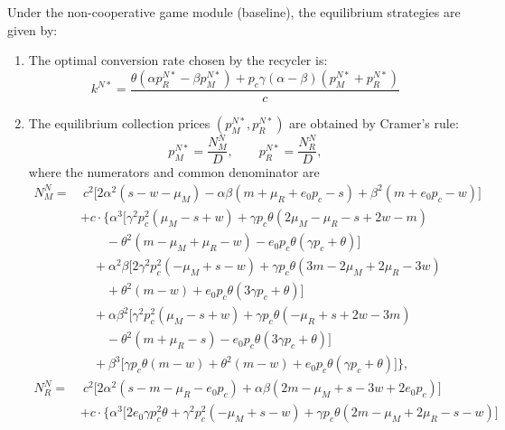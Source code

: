\documentclass[authoryear,preprint,review,times,10pt]{elsarticle}
\begin{document}
\begin{prop}
\label{prop:baseline}
Under the non-cooperative game module (baseline), the equilibrium strategies are given by:
\begin{enumerate}[label={(\arabic*)}]
\item The optimal conversion rate chosen by the recycler is:
\begin{equation}
k^{N*} = \frac{\theta(\alpha p_R^{N*} - \beta p_M^{N*}) + p_c \gamma (\alpha - \beta)(p_M^{N*} + p_R^{N*})}{c}
\label{eq:k_N_star}
\end{equation}

\item The equilibrium collection prices $(p_M^{N*}, p_R^{N*})$ are obtained by Cramer's rule:
\begin{equation}
p_M^{N*} = \frac{N_M^{N}}{D}, \qquad p_R^{N*} = \frac{N_R^{N}}{D},
\label{eq:p_N_star}
\end{equation}
where the numerators and common denominator are
\begin{equation}
\begin{aligned}
N_M^{N} =&\ c^{2}\big[2\alpha^{2}(s - w - \mu_{M}) - \alpha\beta(m + \mu_{R} + e_{0} p_{c} - s) + \beta^{2}(m + e_{0} p_{c} - w)\big] \\
&+ c \cdot \big\{ \alpha^{3}\big[\gamma^{2} p_{c}^{2}(\mu_{M} - s + w) + \gamma p_{c}\theta(2\mu_{M} - \mu_{R} - s + 2w - m) \\
&\qquad - \theta^{2}(m - \mu_{M} + \mu_{R} - w) - e_{0} p_{c}\theta(\gamma p_{c} + \theta)\big] \\
&\quad + \alpha^{2}\beta\big[2\gamma^{2} p_{c}^{2}(-\mu_{M} + s - w) + \gamma p_{c}\theta(3m - 2\mu_{M} + 2\mu_{R} - 3w) \\
&\qquad + \theta^{2}(m - w) + e_{0} p_{c}\theta(3\gamma p_{c} + \theta)\big] \\
&\quad + \alpha\beta^{2}\big[\gamma^{2} p_{c}^{2}(\mu_{M} - s + w) + \gamma p_{c}\theta(-\mu_{R} + s + 2w - 3m) \\
&\qquad - \theta^{2}(m + \mu_{R} - s) - e_{0} p_{c}\theta(3\gamma p_{c} + \theta)\big] \\
&\quad + \beta^{3}\big[\gamma p_{c}\theta(m - w) + \theta^{2}(m - w) + e_{0} p_{c}\theta(\gamma p_{c} + \theta)\big] \big\}, \\[3pt]
N_R^{N} =&\ c^{2}\big[2\alpha^{2}(s - m - \mu_{R} - e_{0} p_{c}) + \alpha\beta(2m - \mu_{M} + s - 3w + 2e_{0} p_{c})\big] \\
&+ c \cdot \big\{ \alpha^{3}\big[2e_{0}\gamma p_{c}^{2}\theta + \gamma^{2} p_{c}^{2}(-\mu_{M} + s - w) + \gamma p_{c}\theta(2m - \mu_{M} + 2\mu_{R} - s - w)\big] \\

\end{aligned}
\end{equation}
\end{enumerate}
\end{prop}
\end{document}

